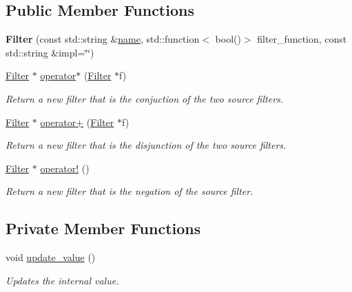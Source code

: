\subsection*{Public Member Functions}
\begin{DoxyCompactItemize}
\item 
\hypertarget{classfv_1_1Filter_a7bb0f3ff6419e820a24be78d48b8769d}{}\label{classfv_1_1Filter_a7bb0f3ff6419e820a24be78d48b8769d} 
{\bfseries Filter} (const std\+::string \&\hyperlink{classfv_1_1GenValue_a610f89ee441eaad4c9e78f74d6bde93b}{name}, std\+::function$<$ bool()$>$ filter\+\_\+function, const std\+::string \&impl=\char`\"{}\char`\"{})
\item 
\hypertarget{classfv_1_1Filter_ae787cf77d98ac3604cba541afad0b351}{}\label{classfv_1_1Filter_ae787cf77d98ac3604cba541afad0b351} 
\hyperlink{classfv_1_1Filter}{Filter} $\ast$ \hyperlink{classfv_1_1Filter_ae787cf77d98ac3604cba541afad0b351}{operator$\ast$} (\hyperlink{classfv_1_1Filter}{Filter} $\ast$f)
\begin{DoxyCompactList}\small\item\em Return a new filter that is the conjuction of the two source filters. \end{DoxyCompactList}\item 
\hypertarget{classfv_1_1Filter_aea96a9a83e172b7fdb64be78b0b3fffe}{}\label{classfv_1_1Filter_aea96a9a83e172b7fdb64be78b0b3fffe} 
\hyperlink{classfv_1_1Filter}{Filter} $\ast$ \hyperlink{classfv_1_1Filter_aea96a9a83e172b7fdb64be78b0b3fffe}{operator+} (\hyperlink{classfv_1_1Filter}{Filter} $\ast$f)
\begin{DoxyCompactList}\small\item\em Return a new filter that is the disjunction of the two source filters. \end{DoxyCompactList}\item 
\hypertarget{classfv_1_1Filter_abb459c8bbb3b51cd85ab5a0f7b2f154d}{}\label{classfv_1_1Filter_abb459c8bbb3b51cd85ab5a0f7b2f154d} 
\hyperlink{classfv_1_1Filter}{Filter} $\ast$ \hyperlink{classfv_1_1Filter_abb459c8bbb3b51cd85ab5a0f7b2f154d}{operator!} ()
\begin{DoxyCompactList}\small\item\em Return a new filter that is the negation of the source filter. \end{DoxyCompactList}\end{DoxyCompactItemize}
\subsection*{Private Member Functions}
\begin{DoxyCompactItemize}
\item 
void \hyperlink{classfv_1_1Filter_ab3ed620127ccb32f75bc5e78bc8a60b3}{update\+\_\+value} ()
\begin{DoxyCompactList}\small\item\em Updates the internal value. \end{DoxyCompactList}\end{DoxyCompactItemize}
